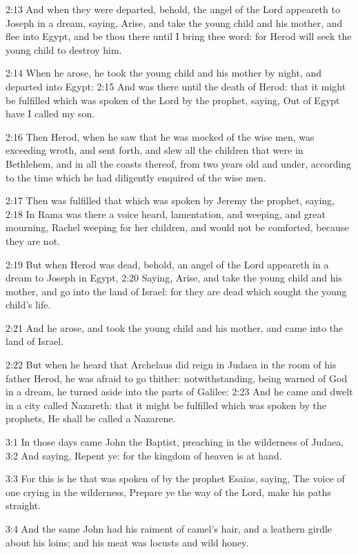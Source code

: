 2:13 And when they were departed, behold, the angel of the Lord appeareth to Joseph in a dream, saying, Arise, and take the young child and his mother, and flee into Egypt, and be thou there until I bring thee word: for Herod will seek the young child to destroy him.

2:14 When he arose, he took the young child and his mother by night, and departed into Egypt: 2:15 And was there until the death of Herod: that it might be fulfilled which was spoken of the Lord by the prophet, saying, Out of Egypt have I called my son.

2:16 Then Herod, when he saw that he was mocked of the wise men, was exceeding wroth, and sent forth, and slew all the children that were in Bethlehem, and in all the coasts thereof, from two years old and under, according to the time which he had diligently enquired of the wise men.

2:17 Then was fulfilled that which was spoken by Jeremy the prophet, saying, 2:18 In Rama was there a voice heard, lamentation, and weeping, and great mourning, Rachel weeping for her children, and would not be comforted, because they are not.

2:19 But when Herod was dead, behold, an angel of the Lord appeareth in a dream to Joseph in Egypt, 2:20 Saying, Arise, and take the young child and his mother, and go into the land of Israel: for they are dead which sought the young child's life.

2:21 And he arose, and took the young child and his mother, and came into the land of Israel.

2:22 But when he heard that Archelaus did reign in Judaea in the room of his father Herod, he was afraid to go thither: notwithstanding, being warned of God in a dream, he turned aside into the parts of Galilee: 2:23 And he came and dwelt in a city called Nazareth: that it might be fulfilled which was spoken by the prophets, He shall be called a Nazarene.

3:1 In those days came John the Baptist, preaching in the wilderness of Judaea, 3:2 And saying, Repent ye: for the kingdom of heaven is at hand.

3:3 For this is he that was spoken of by the prophet Esaias, saying, The voice of one crying in the wilderness, Prepare ye the way of the Lord, make his paths straight.

3:4 And the same John had his raiment of camel's hair, and a leathern girdle about his loins; and his meat was locusts and wild honey.

